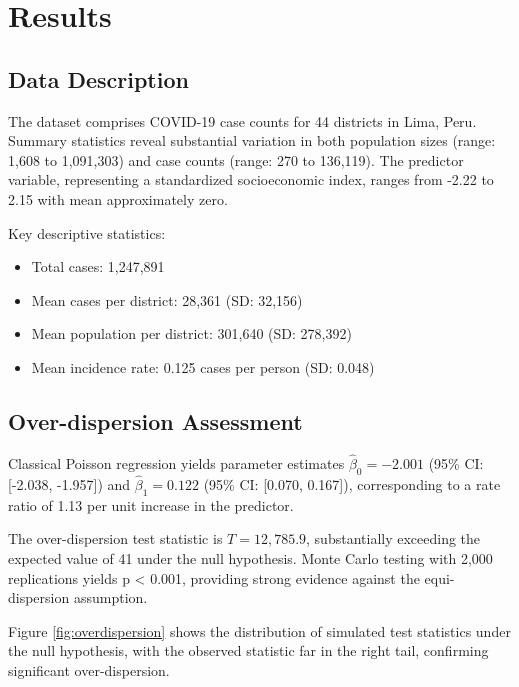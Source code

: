 \documentclass[11pt]{article}
\begin{document}
\section{Results}

\subsection{Data Description}

The dataset comprises COVID-19 case counts for 44 districts in Lima, Peru. Summary statistics reveal substantial variation in both population sizes (range: 1,608 to 1,091,303) and case counts (range: 270 to 136,119). The predictor variable, representing a standardized socioeconomic index, ranges from -2.22 to 2.15 with mean approximately zero.

Key descriptive statistics:
\begin{itemize}
\item Total cases: 1,247,891
\item Mean cases per district: 28,361 (SD: 32,156)
\item Mean population per district: 301,640 (SD: 278,392)
\item Mean incidence rate: 0.125 cases per person (SD: 0.048)
\end{itemize}

\subsection{Over-dispersion Assessment}

Classical Poisson regression yields parameter estimates $\hat{\beta}_0 = -2.001$ (95\% CI: [-2.038, -1.957]) and $\hat{\beta}_1 = 0.122$ (95\% CI: [0.070, 0.167]), corresponding to a rate ratio of 1.13 per unit increase in the predictor.

The over-dispersion test statistic is $T = 12,785.9$, substantially exceeding the expected value of 41 under the null hypothesis. Monte Carlo testing with 2,000 replications yields p < 0.001, providing strong evidence against the equi-dispersion assumption.

Figure \ref{fig:overdispersion} shows the distribution of simulated test statistics under the null hypothesis, with the observed statistic far in the right tail, confirming significant over-dispersion.
\end{document}
